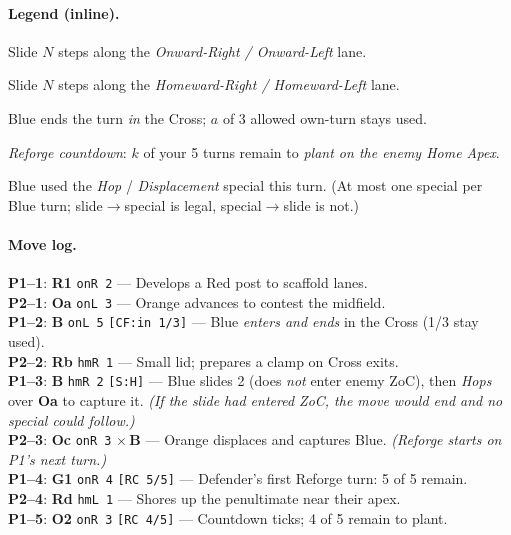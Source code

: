 \documentclass[11pt]{article}
\begin{document}
\paragraph{Legend (inline).}
\begin{description}[leftmargin=2.5em,labelsep=0.6em]
  \item[\texttt{onR N} / \texttt{onL N}] Slide $N$ steps along the \emph{Onward-Right / Onward-Left} lane.
  \item[\texttt{hmR N} / \texttt{hmL N}] Slide $N$ steps along the \emph{Homeward-Right / Homeward-Left} lane.
  \item[\texttt{[CF:in a/3]}] Blue ends the turn \emph{in} the Cross; $a$ of 3 allowed own-turn stays used.
  \item[\texttt{[RC k/5]}] \emph{Reforge countdown}: $k$ of your 5 turns remain to \emph{plant on the enemy Home Apex}.
  \item[\texttt{[S:H]} / \texttt{[S:D]}] Blue used the \emph{Hop} / \emph{Displacement} special this turn. (At most one special per Blue turn; slide$\rightarrow$special is legal, special$\rightarrow$slide is not.)
\end{description}

\paragraph{Move log.}
\noindent\textbf{P1--1}: \textbf{R1} \texttt{onR 2} --- Develops a Red post to scaffold lanes.\\
\textbf{P2--1}: \textbf{Oa} \texttt{onL 3} --- Orange advances to contest the midfield.\\[2pt]
\textbf{P1--2}: \textbf{B} \texttt{onL 5} \texttt{[CF:in 1/3]} --- Blue \emph{enters and ends} in the Cross (1/3 stay used).\\
\textbf{P2--2}: \textbf{Rb} \texttt{hmR 1} --- Small lid; prepares a clamp on Cross exits.\\[2pt]
\textbf{P1--3}: \textbf{B} \texttt{hmR 2} \texttt{[S:H]} --- Blue slides 2 (does \emph{not} enter enemy ZoC), then \emph{Hops} over \textbf{Oa} to capture it. \emph{(If the slide had entered ZoC, the move would end and no special could follow.)}\\
\textbf{P2--3}: \textbf{Oc} \texttt{onR 3} $\times$\,\textbf{B} --- Orange displaces and captures Blue. \emph{(Reforge starts on P1's next turn.)}\\[2pt]
\textbf{P1--4}: \textbf{G1} \texttt{onR 4} \texttt{[RC 5/5]} --- Defender's first Reforge turn: 5 of 5 remain.\\
\textbf{P2--4}: \textbf{Rd} \texttt{hmL 1} --- Shores up the penultimate near their apex.\\
\textbf{P1--5}: \textbf{O2} \texttt{onR 3} \texttt{[RC 4/5]} --- Countdown ticks; 4 of 5 remain to plant.\\[4pt]
\end{document}
